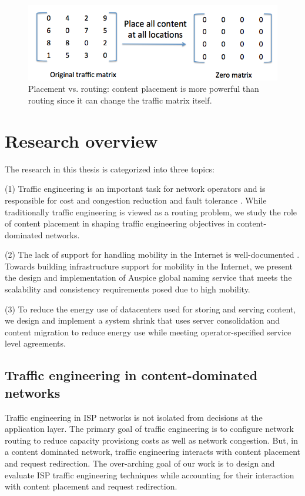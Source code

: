 \begin{figure}
	\centering
	\includegraphics[scale=0.4]{fig/placement-vs-routing.png}
	\caption{Placement vs. routing: content placement is more powerful than routing since it can change the  traffic matrix itself.}
	\label{fig:placement-routing}
\end{figure}


\section{Research overview}

The research in this thesis is categorized into three topics: 

(1) Traffic engineering is an important task for network operators and is responsible for cost and congestion reduction and fault tolerance \cite{rexford,COPE,TEXCP}. While traditionally traffic engineering is viewed as a routing problem, we study the role of content placement in shaping traffic engineering objectives in content-dominated networks.

(2) The lack of support for handling mobility in the Internet is well-documented \cite{HIP,LISP,HAIR,MobilityFirst}. Towards building infrastructure support for mobility in the Internet, we present the design and implementation of Auspice global naming service that meets the scalability and consistency requirements posed due to high mobility.

(3) To reduce the energy use of datacenters used for storing and serving content, we design and implement a system shrink that uses server consolidation and content migration to reduce energy use while meeting operator-specified service level agreements.


\subsection{Traffic engineering in content-dominated networks}

Traffic engineering in ISP networks is not isolated from decisions at the application layer.
The primary goal of traffic engineering is to configure network routing to reduce capacity provisiong costs as well as network congestion.
But, in a content dominated network, traffic engineering interacts with content placement and request redirection. The over-arching goal of our work is to design and evaluate ISP traffic engineering techniques while accounting for their interaction with content placement and request redirection. 


